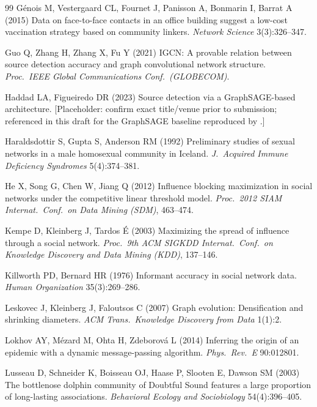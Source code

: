 \documentclass[ijoc,sglanonrev]{informs4}
\begin{document}
\begin{thebibliography}{99}
G\'enois M, Vestergaard CL, Fournet J, Panisson A, Bonmarin I, Barrat A
  (2015) Data on face-to-face contacts in an office building suggest a
  low-cost vaccination strategy based on community linkers. \emph{Network
  Science} 3(3):326--347.

Guo Q, Zhang H, Zhang X, Fu Y (2021) IGCN: A provable relation between
  source detection accuracy and graph convolutional network structure.
  \emph{Proc.\ IEEE Global Communications Conf.\ (GLOBECOM)}.

Haddad LA, Figueiredo DR (2023) Source detection via a GraphSAGE-based
  architecture. [Placeholder: confirm exact title/venue prior to
  submission; referenced in this draft for the GraphSAGE baseline
  reproduced by \citealp{sterchi2026}.]

Haraldsdottir S, Gupta S, Anderson RM (1992) Preliminary studies of sexual
  networks in a male homosexual community in Iceland. \emph{J.\ Acquired
  Immune Deficiency Syndromes} 5(4):374--381.

He X, Song G, Chen W, Jiang Q (2012) Influence blocking maximization in
  social networks under the competitive linear threshold model.
  \emph{Proc.\ 2012 SIAM Internat.\ Conf.\ on Data Mining (SDM)}, 463--474.

Kempe D, Kleinberg J, Tardos {\'E} (2003) Maximizing the spread of influence
  through a social network. \emph{Proc.\ 9th ACM SIGKDD Internat.\ Conf.\ on
  Knowledge Discovery and Data Mining (KDD)}, 137--146.

Killworth PD, Bernard HR (1976) Informant accuracy in social network data.
  \emph{Human Organization} 35(3):269--286.

Leskovec J, Kleinberg J, Faloutsos C (2007) Graph evolution: Densification
  and shrinking diameters. \emph{ACM Trans.\ Knowledge Discovery from
  Data} 1(1):2.

Lokhov AY, M\'ezard M, Ohta H, Zdeborov\'a L (2014) Inferring the origin
  of an epidemic with a dynamic message-passing algorithm. \emph{Phys.\
  Rev.\ E} 90:012801.

Lusseau D, Schneider K, Boisseau OJ, Haase P, Slooten E, Dawson SM (2003)
  The bottlenose dolphin community of Doubtful Sound features a large
  proportion of long-lasting associations. \emph{Behavioral Ecology and
  Sociobiology} 54(4):396--405.


\end{thebibliography}
\end{document}
